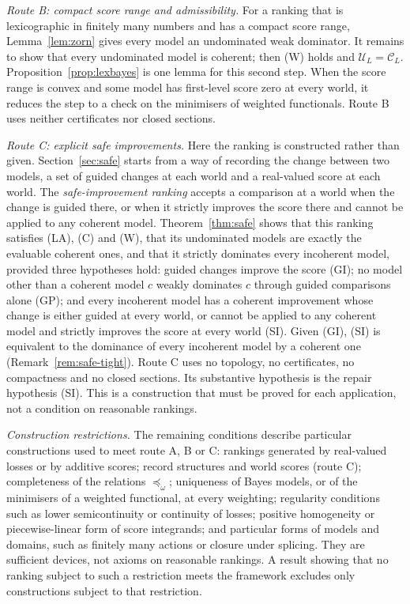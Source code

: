 \documentclass[11pt]{article}
\theoremstyle{definition}
\theoremstyle{remark}
\newcommand{\C}{\mathcal C}
\newcommand{\U}{\mathcal U}
\begin{document}
\emph{Route B: compact score range and admissibility.} For a ranking that is lexicographic in finitely many numbers and has a compact score range, Lemma~\ref{lem:zorn} gives every model an undominated weak dominator. It remains to show that every undominated model is coherent; then (W) holds and $\U_L=\C_L$. Proposition~\ref{prop:lexbayes} is one lemma for this second step. When the score range is convex and some model has first-level score zero at every world, it reduces the step to a check on the minimisers of weighted functionals. Route B uses neither certificates nor closed sections.

\emph{Route C: explicit safe improvements.} Here the ranking is constructed rather than given. Section~\ref{sec:safe} starts from a way of recording the change between two models, a set of guided changes at each world and a real-valued score at each world. The \emph{safe-improvement ranking} accepts a comparison at a world when the change is guided there, or when it strictly improves the score there and cannot be applied to any coherent model. Theorem~\ref{thm:safe} shows that this ranking satisfies (LA), (C) and (W), that its undominated models are exactly the evaluable coherent ones, and that it strictly dominates every incoherent model, provided three hypotheses hold: guided changes improve the score (GI); no model other than a coherent model $c$ weakly dominates $c$ through guided comparisons alone (GP); and every incoherent model has a coherent improvement whose change is either guided at every world, or cannot be applied to any coherent model and strictly improves the score at every world (SI). Given (GI), (SI) is equivalent to the dominance of every incoherent model by a coherent one (Remark~\ref{rem:safe-tight}). Route C uses no topology, no certificates, no compactness and no closed sections. Its substantive hypothesis is the repair hypothesis (SI). This is a construction that must be proved for each application, not a condition on reasonable rankings.

\emph{Construction restrictions.} The remaining conditions describe particular constructions used to meet route A, B or C: rankings generated by real-valued losses or by additive scores; record structures and world scores (route C); completeness of the relations $\preceq_\omega$; uniqueness of Bayes models, or of the minimisers of a weighted functional, at every weighting; regularity conditions such as lower semicontinuity or continuity of losses; positive homogeneity or piecewise-linear form of score integrands; and particular forms of models and domains, such as finitely many actions or closure under splicing. They are sufficient devices, not axioms on reasonable rankings. A result showing that no ranking subject to such a restriction meets the framework excludes only constructions subject to that restriction.
\end{document}
